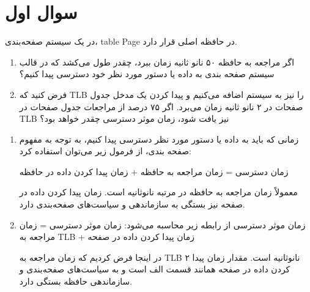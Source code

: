 \section{سوال اول}

در یک سیستم صفحه‌بندی، table Page در حافظه اصلی قرار دارد.

\begin{enumerate}
	\item اگر مراجعه به حافظه ۵۰ نانو ثانیه زمان ببرد، چقدر طول می‌کشد که در قالب سیستم صفحه بندی به داده یا دستور مورد نظر خود دسترسی پیدا کنیم؟
	
	\item فرض کنید که TLB را نیز به سیستم اضافه می‌کنیم و پیدا کردن یک مدخل جدول صفحات در ۲ نانو ثانیه زمان می‌برد. اگر ۷۵ درصد از مراجعات جدول صفحات در TLB نیز یافت شود، زمان موثر دسترسی چقدر خواهد بود؟
\end{enumerate}


\begin{qsolve}
	
	\begin{enumerate}
		\item  زمانی که باید به داده یا دستور مورد نظر دسترسی پیدا کنیم، به توجه به مفهوم صفحه بندی، از فرمول زیر می‌توان استفاده کرد:
		
		زمان دسترسی = زمان مراجعه به حافظه + زمان پیدا کردن داده در حافظه
		
		معمولاً زمان مراجعه به حافظه در مرتبه نانوثانیه است. زمان پیدا کردن داده در صفحه نیز بستگی به سازماندهی و سیاست‌های صفحه‌بندی دارد.
		
		
		\item زمان موثر دسترسی از رابطه زیر محاسبه می‌شود:
		زمان موثر دسترسی = زمان مراجعه به TLB + زمان پیدا کردن داده در صفحه
		
		در اینجا فرض کردیم که زمان مراجعه به TLB ۲ نانوثانیه است. مقدار زمان پیدا کردن داده در صفحه همانند قسمت الف است و به سیاست‌های صفحه‌بندی و سازماندهی حافظه بستگی دارد.
	\end{enumerate}
	
\end{qsolve}